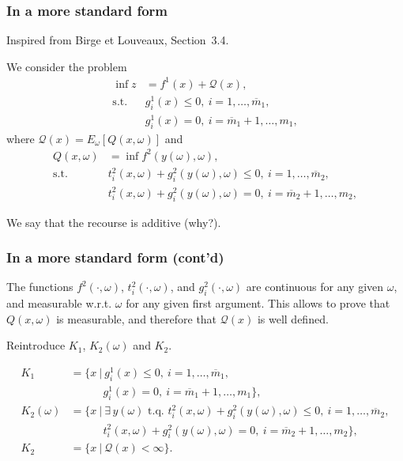 \documentclass{beamer}
\begin{document}
\begin{frame}
\frametitle{In a more standard form}

Inspired from Birge et Louveaux, Section~3.4.

\mbox{}

We consider the problem
\begin{align*}
\inf z &= f^1(x) + \mathcal{Q}(x), \\
\mbox{s.t. } & g_i^1(x) \leq 0,\ i = 1,\ldots,\overline{m}_1, \\
& g_i^1(x) = 0,\ i = \overline{m}_1+1,\ldots,m_1,
\end{align*}
where $\mathcal{Q}(x) = E_{\omega}[Q(x,\omega)]$ and
\begin{align*}
Q(x,\omega) &= \inf f^2(y(\omega), \omega), \\
\mbox{s.t. } & t_i^2(x, \omega) + g_i^2(y(\omega), \omega) \leq 0,\ i
= 1,\ldots,\overline{m}_2,\\
& t_i^2(x, \omega) + g_i^2(y(\omega), \omega) = 0,\ i =
\overline{m}_2+1,\ldots,m_2,
\end{align*}

\mbox{}

We say that the recourse is additive (why?).

\end{frame}

\begin{frame}
\frametitle{In a more standard form (cont'd)}

The functions $f^2(\cdot, \omega)$, $t_i^2(\cdot, \omega)$, and $g_i^2(\cdot, \omega)$ are continuous for any given $\omega$, and measurable w.r.t. $\omega$ for any given first argument.
This allows to prove that $Q(x,\omega)$ is measurable, and therefore that $\mathcal{Q}(x)$ is well defined.

\mbox{}

Reintroduce $K_1$, $K_2(\omega)$ and $K_2$.

\begin{align*}
K_1 & = \lbrace x \ |\ g_i^1(x) \leq 0,\ i =
1,\ldots,\overline{m}_1, \\
& \quad \qquad g_i^1(x) = 0,\ i = \overline{m}_1+1,\ldots,m_1 \rbrace, \\
K_2(\omega) & = \lbrace x \ |\ \exists\, y(\omega) \mbox{ t.q. }
 t_i^2(x, \omega) + g_i^2(y(\omega), \omega) \leq 0,\ i
= 1,\ldots,\overline{m}_2,\\
& \quad \qquad t_i^2(x, \omega) + g_i^2(y(\omega), \omega) = 0, \ i =
\overline{m}_2+1,\ldots,m_2 \rbrace, \\
K_2 & = \lbrace x \ |\ \mathcal{Q}(x) < \infty \rbrace.
\end{align*}

\end{frame}
\end{document}
